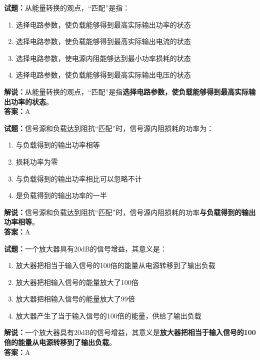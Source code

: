 \documentclass{ctexbook}
\begin{document}
\vspace{1em}

\textbf{试题：}从能量转换的观点，“匹配”是指：
\begin{enumerate}[leftmargin=3em]
  \item 选择电路参数，使负载能够得到最高实际输出功率的状态
  \item 选择电路参数，使负载能够得到最高实际输出电流的状态
  \item 选择电路参数，使电源内阻能够达到最小功率损耗的状态
  \item 选择电路参数，使负载能够得到最高实际输出电压的状态
\end{enumerate}
\noindent\textbf{解说：}从能量转换的观点，“匹配”是指\textbf{选择电路参数，使负载能够得到最高实际输出功率的状态}。\\\noindent\textbf{答案：}A

\vspace{1em}

\textbf{试题：}信号源和负载达到阻抗“匹配”时，信号源内阻损耗的功率为：
\begin{enumerate}[leftmargin=3em]
  \item 与负载得到的输出功率相等
  \item 损耗功率为零
  \item 与负载得到的输出功率相比可以忽略不计
  \item 是负载得到的输出功率的一半
\end{enumerate}
\noindent\textbf{解说：}信号源和负载达到阻抗“匹配”时，信号源内阻损耗的功率\textbf{与负载得到的输出功率相等}。\\\noindent\textbf{答案：}A

\vspace{1em}

\textbf{试题：}一个放大器具有20dB的信号增益，其意义是：
\begin{enumerate}[leftmargin=3em]
  \item 放大器把相当于输入信号的100倍的能量从电源转移到了输出负载
  \item 放大器把相输入信号的能量放大了100倍
  \item 放大器把相输入信号的能量放大了99倍
  \item 放大器产生了当于输入信号的100倍的能量，供给了输出负载
\end{enumerate}
\noindent\textbf{解说：}一个放大器具有20dB的信号增益，其意义是\textbf{放大器把相当于输入信号的100倍的能量从电源转移到了输出负载}。\\\noindent\textbf{答案：}A

\vspace{1em}
\end{document}
